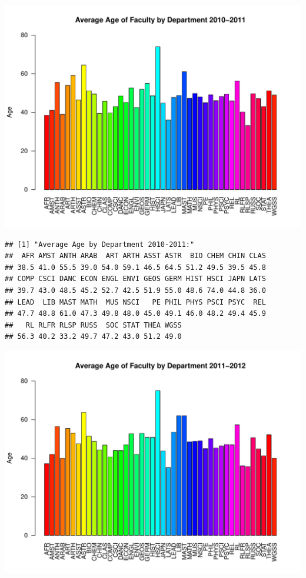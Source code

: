 \documentclass[12pt,a4paper]{article}\usepackage[]{graphicx}\usepackage[]{color}
\makeatletter
\def\maxwidth{ %
  \ifdim\Gin@nat@width>\linewidth
    \linewidth
  \else
    \Gin@nat@width
  \fi
}
\newenvironment{kframe}{%
 \def\at@end@of@kframe{}%
 \ifinner\ifhmode%
  \def\at@end@of@kframe{\end{minipage}}%
  \begin{minipage}{\columnwidth}%
 \fi\fi%
 \def\FrameCommand##1{\hskip\@totalleftmargin \hskip-\fboxsep
 \colorbox{shadecolor}{##1}\hskip-\fboxsep
     \hskip-\linewidth \hskip-\@totalleftmargin \hskip\columnwidth}%
 \MakeFramed {\advance\hsize-\width
   \@totalleftmargin\z@ \linewidth\hsize
   \@setminipage}}%
 {\par\unskip\endMakeFramed%
 \at@end@of@kframe}
\newenvironment{knitrout}{}{} %
\theoremstyle{definition}
\makeatother
\begin{document}
\begin{knitrout}
\includegraphics[width=\maxwidth]{figure/unnamed-chunk-10-7} 
\begin{kframe}\begin{verbatim}
## [1] "Average Age by Department 2010-2011:"
##  AFR AMST ANTH ARAB  ART ARTH ASST ASTR  BIO CHEM CHIN CLAS 
## 38.5 41.0 55.5 39.0 54.0 59.1 46.5 64.5 51.2 49.5 39.5 45.8 
## COMP CSCI DANC ECON ENGL ENVI GEOS GERM HIST HSCI JAPN LATS 
## 39.7 43.0 48.5 45.2 52.7 42.5 51.9 55.0 48.6 74.0 44.8 36.0 
## LEAD  LIB MAST MATH  MUS NSCI   PE PHIL PHYS PSCI PSYC  REL 
## 47.7 48.8 61.0 47.3 49.8 48.0 45.0 49.1 46.0 48.2 49.4 45.9 
##   RL RLFR RLSP RUSS  SOC STAT THEA WGSS 
## 56.3 40.2 33.2 49.7 47.2 43.0 51.2 49.0
\end{verbatim}
\end{kframe}
\includegraphics[width=\maxwidth]{figure/unnamed-chunk-10-8} 

\end{knitrout}
\end{document}
